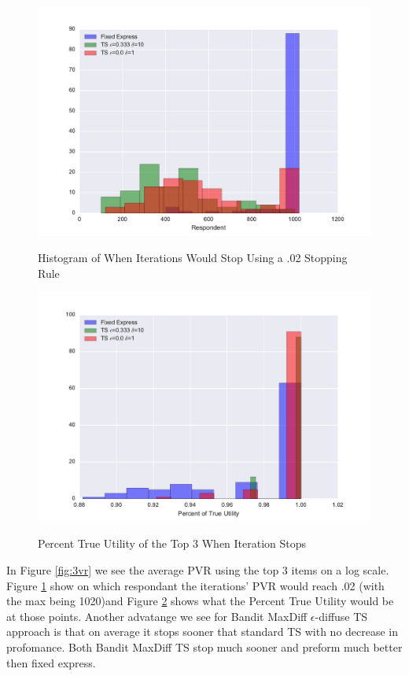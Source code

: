 \documentclass[mksc,blindrev]{informs3} %
\begin{document}
\begin{figure}
\caption{Histogram of When Iterations Would Stop Using a .02 Stopping Rule}
\includegraphics[width=1\textwidth]{plots/stop120items23.pdf}
\label{fig:3vrhist}
\end{figure}
\begin{figure}
\caption{Percent True Utility of the Top 3 When Iteration Stops}
\includegraphics[width=1\textwidth]{plots/util120items23.pdf}
\label{fig:3vrutil}
\end{figure}
In Figure \ref{fig:3vr} we see the average PVR using the top 3 items on a log scale. Figure \ref{fig:3vrhist} show on which respondant the iterations' PVR would reach .02 (with the max being 1020)and Figure \ref{fig:3vrutil} shows what the Percent True Utility would be at those points. Another advatange we see for Bandit MaxDiff $\epsilon$-diffuse TS approach is that on average it stops sooner that standard TS with no decrease in profomance. Both Bandit MaxDiff TS stop much sooner and preform much better then fixed express.\\
\end{document}
